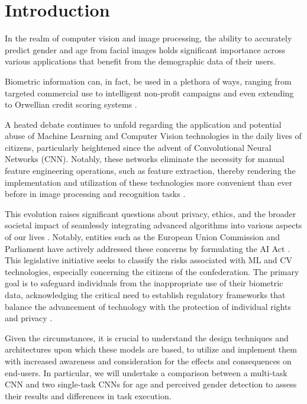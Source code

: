 \section{Introduction} \label{sec:introduction}
In the realm of computer vision and image processing,
the ability to accurately predict gender and age from facial
images holds significant importance across various applications that benefit
from the demographic data of their users.

Biometric information can, in fact, be used in a plethora of ways,
ranging from targeted commercial use \cite{int1} to intelligent non-profit campaigns \cite{int2}
and even extending to Orwellian credit scoring systems \cite{int3}.

A heated debate continues to unfold regarding the application
and potential abuse of Machine Learning and Computer Vision
technologies in the daily lives of citizens, particularly heightened
since the advent of Convolutional Neural Networks (CNN).
Notably, these networks eliminate the necessity for manual feature
engineering operations, such as feature extraction, thereby rendering the
implementation and utilization of these technologies more convenient than
ever before 
in image processing and recognition tasks
\cite{int6}. 

This evolution raises significant questions about privacy, ethics, and
the broader societal impact of seamlessly integrating advanced algorithms
into various aspects of our lives \cite{int7}. 
Notably, entities such as the European Union Commission and Parliament
have actively addressed these concerns by formulating the AI Act \cite{int4}.
This legislative initiative seeks to classify the risks associated with
ML and CV technologies, especially concerning the citizens of the
confederation. The primary goal is to safeguard individuals
from the inappropriate use of their biometric data, acknowledging
the critical need to establish regulatory frameworks that balance
the advancement of technology with the protection of individual
rights and privacy  \cite{int5}.

Given the circumstances, it is crucial to understand the design
techniques and architectures upon which these models are based,
to utilize and implement them with increased awareness and
consideration for the effects and consequences on end-users.
In particular, we will undertake a comparison between a multi-task
CNN and two single-task CNNs for
age and perceived gender detection to assess their results and
differences in task execution.